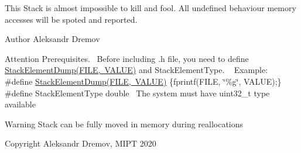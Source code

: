 This Stack is almost impossible to kill and fool. All undefined behaviour memory accesses will be spoted and reported. \begin{DoxyAuthor}{Author}
Aleksandr Dremov 
\end{DoxyAuthor}
\begin{DoxyAttention}{Attention}
Prerequisites.~\newline
 Before including .h file, you need to define \mbox{\hyperlink{StackRigid_8h_a231d62549d9cfc45a003c319b7e1779e}{Stack\+Element\+Dump(\+F\+I\+L\+E, V\+A\+L\+U\+E)}} and Stack\+Element\+Type. ~\newline
Example\+:~\newline
\#define \mbox{\hyperlink{StackRigid_8h_a231d62549d9cfc45a003c319b7e1779e}{Stack\+Element\+Dump(\+F\+I\+L\+E, V\+A\+L\+U\+E)}} \{fprintf(F\+I\+LE, \char`\"{}\%g\char`\"{}, V\+A\+L\+UE);\}~\newline
\#define Stack\+Element\+Type double~\newline
The system must have uint32\+\_\+t type available~\newline

\end{DoxyAttention}
\begin{DoxyWarning}{Warning}
Stack can be fully moved in memory during reallocations 
\end{DoxyWarning}
\begin{DoxyCopyright}{Copyright}
Aleksandr Dremov, M\+I\+PT 2020 
\end{DoxyCopyright}
